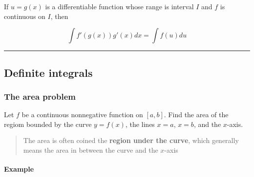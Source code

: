 \documentclass[
]{article}
\begin{document}
If \(u=g(x)\) is a differentiable function whose range is interval \(I\)
and \(f\) is continuous on \(I\), then

\[ \int f'(g(x))g'(x)dx = \int f(u)du \]

\begin{center}\rule{0.5\linewidth}{0.5pt}\end{center}

\hypertarget{definite-integrals}{%
\subsection{Definite integrals}\label{definite-integrals}}

\hypertarget{the-area-problem}{%
\subsubsection{The area problem}\label{the-area-problem}}

Let \(f\) be a continuous nonnegative function on \([a,b]\). Find the
area of the regiom bounded by the curve \(y=f(x)\), the lines \(x=a\),
\(x=b\), and the \(x\)-axis.

\begin{quote}
The area is often coined the \textbf{region under the curve}, which
generally means the area in between the curve and the \(x\)-axis
\end{quote}

\hypertarget{example-3}{%
\paragraph*{Example}\label{example-3}}
\end{document}
